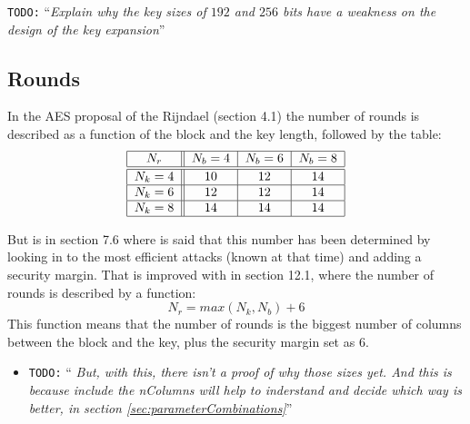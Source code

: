 \documentclass[10pt,a4paper,twoside]{llncs}
\newcommand{\todo}[1]{\texttt{\color{red}TODO:} ``\emph{#1}''}
\begin{document}
\todo{Explain why the key sizes of $192$ and $256$ bits have a weakness on the design of the key expansion}

\subsection{Rounds}\label{sec:rounds}

In the AES proposal of the Rijndael \cite{Daemen01aes-ammended} (section 4.1) the number of rounds is described as a function of the block and the key length, followed by the table:
\begin{equation}\label{tab:nrounds}
\begin{tabular}{|c||c|c|c|}
\hline
$N_r$     & $N_b = 4$ & $N_b = 6$ & $N_b = 8$ \\ \hline\hline
$N_k = 4$ &    $10$   &    $12$   &    $14$   \\ \hline
$N_k = 6$ &    $12$   &    $12$   &    $14$   \\ \hline
$N_k = 8$ &    $14$   &    $14$   &    $14$   \\ \hline
\end{tabular}
\end{equation}

 But is in section 7.6 where is said that this number has been determined by looking in to the most efficient attacks (known at that time) and adding a security margin. That is improved with in section 12.1, where the number of rounds is described by a function:
\begin{equation}\label{eq:nrounds}
 N_r = max(N_k,N_b)+6
\end{equation}
This function means that the number of rounds is the biggest number of columns between the block and the key, plus the security margin set as $6$.

\begin{itemize}
 \item \todo{ But, with this, there isn't a proof of why those sizes yet. And this is because include the \emph{nColumns} will help to inderstand and decide which way is better, in section \ref{sec:parameterCombinations}}
\end{itemize}



\end{document}
